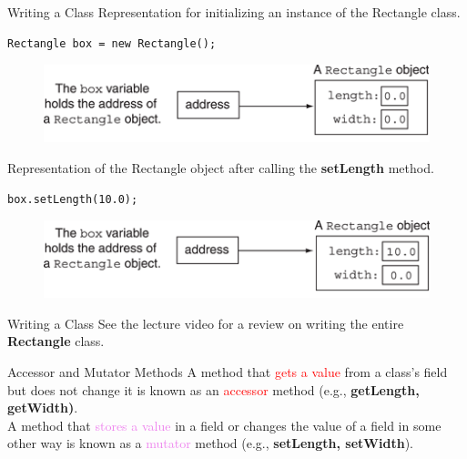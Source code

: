 \documentclass[11pt]{beamer}
\newcommand{\red}[1]{\textcolor{red}{#1}}
\newcommand{\violet}[1]{\textcolor{violet}{#1}}
\begin{document}
\begin{frame}[fragile]{Writing a Class}
\footnotesize
Representation for initializing an instance of the Rectangle class.
    \begin{lstlisting}
Rectangle box = new Rectangle();
    \end{lstlisting}
    \noindent 
    \begin{figure}[H]
    \centering
    \includegraphics[scale=0.9]{Images/chapter06_InitRectangle.png}
    \end{figure}
Representation of the Rectangle object after calling the \textbf{setLength} method.
    \begin{lstlisting}
box.setLength(10.0);
    \end{lstlisting}
    \noindent 
    \begin{figure}[H]
    \centering
    \includegraphics[scale=0.9]{Images/chapter06_ValueRectangle.png}
    \end{figure}
\end{frame}

\begin{frame}{Writing a Class}
    See the lecture video for a review on writing the entire \textbf{Rectangle} class.
\end{frame}

\begin{frame}{Accessor and Mutator Methods}
    A method that \red{gets a value} from a class’s field but does not change it is known as an \red{accessor} method (e.g., \textbf{getLength, getWidth)}. \\ \vspace{1em}
    A method that \violet{stores a value} in a field or changes the value of a field in some other way is known as a \violet{mutator} method (e.g., \textbf{setLength, setWidth}).
\end{frame}
\end{document}
